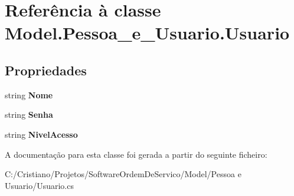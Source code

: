 \hypertarget{class_model_1_1_pessoa__e___usuario_1_1_usuario}{}\section{Referência à classe Model.\+Pessoa\+\_\+e\+\_\+\+Usuario.\+Usuario}
\label{class_model_1_1_pessoa__e___usuario_1_1_usuario}
\subsection*{Propriedades}
\begin{DoxyCompactItemize}
\item 
\hypertarget{class_model_1_1_pessoa__e___usuario_1_1_usuario_ab28403069bfa081c90c4570139e1c923}{}string {\bfseries Nome}\label{class_model_1_1_pessoa__e___usuario_1_1_usuario_ab28403069bfa081c90c4570139e1c923}

\item 
\hypertarget{class_model_1_1_pessoa__e___usuario_1_1_usuario_a6a111adad476bc88b0320febd535e170}{}string {\bfseries Senha}\label{class_model_1_1_pessoa__e___usuario_1_1_usuario_a6a111adad476bc88b0320febd535e170}

\item 
\hypertarget{class_model_1_1_pessoa__e___usuario_1_1_usuario_a57734a8566a6930b043bcaae24aae066}{}string {\bfseries Nivel\+Acesso}\label{class_model_1_1_pessoa__e___usuario_1_1_usuario_a57734a8566a6930b043bcaae24aae066}

\end{DoxyCompactItemize}


A documentação para esta classe foi gerada a partir do seguinte ficheiro\+:\begin{DoxyCompactItemize}
\item 
C\+:/\+Cristiano/\+Projetos/\+Software\+Ordem\+De\+Servico/\+Model/\+Pessoa e Usuario/Usuario.\+cs\end{DoxyCompactItemize}
